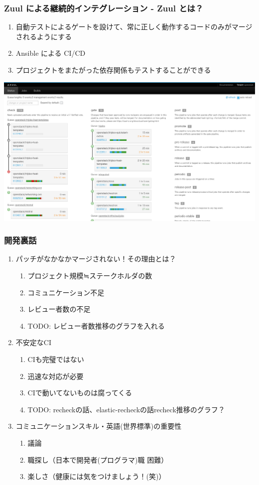 \documentclass[aspectratio=169,11pt,hyperref={colorlinks=true}]{beamer}
\begin{document}
\begin{frame}
  \frametitle{Zuul による継続的インテグレーション - Zuul とは？}
  \begin{enumerate}
    \item 自動テストによるゲートを設けて、常に正しく動作するコードのみがマージされるようにする
    \item Ansible による CI/CD
    \item プロジェクトをまたがった依存関係もテストすることができる
  \end{enumerate}
  \centering\includegraphics[scale=0.2]{images/zuul-status.png}
\end{frame}

\begin{frame}
  \frametitle{開発裏話}
  \begin{enumerate}
    \item パッチがなかなかマージされない！その理由とは？
      \begin{enumerate}
        \item プロジェクト規模≒ステークホルダの数
        \item コミュニケーション不足
        \item レビュー者数の不足
        \item TODO: レビュー者数推移のグラフを入れる
      \end{enumerate}
    \item 不安定なCI
      \begin{enumerate}
        \item CIも完璧ではない
        \item 迅速な対応が必要
        \item CIで動いてないものは腐ってくる
        \item TODO: recheckの話、elastic-recheckの話recheck推移のグラフ？
      \end{enumerate}
    \item コミュニケーションスキル・英語(世界標準)の重要性
      \begin{enumerate}
        \item 議論
        \item 職探し（日本で開発者(プログラマ)職 困難）
        \item 楽しさ（健康には気をつけましょう！(笑)）
      \end{enumerate}
  \end{enumerate}
\end{frame}
\end{document}
